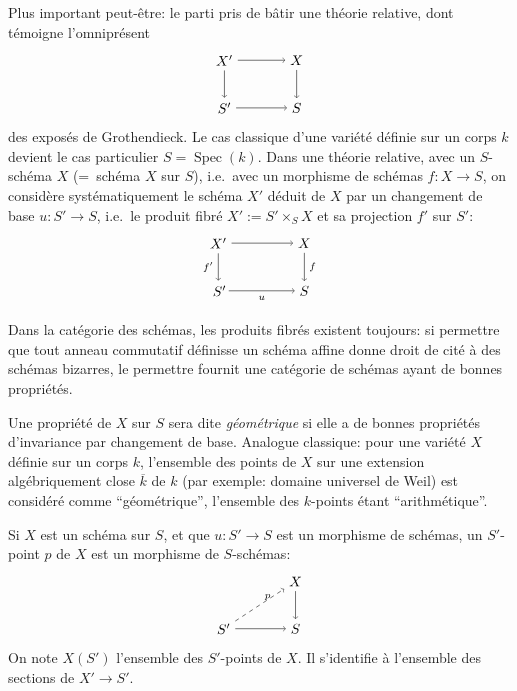 \documentclass[11pt,a4paper]{article}
\theoremstyle{plain}
\theoremstyle{definition}
\DeclareMathOperator{\Spec}{Spec}
\begin{document}
Plus important peut-\^etre: le parti pris de b\^atir une th\'eorie relative, dont t\'emoigne l'omnipr\'esent
\[
\begin{tikzpicture}[baseline=-0.5ex,scale=1.2]
\node (X') at (0,1) {$X'$};
\node (X) at (1.5,1) {$X$};
\node (S') at (0,0) {$S'$};
\node (S) at (1.5,0) {$S$};
\draw[->] (X') -- (X);
\draw[->] (X') -- (S');
\draw[->] (X) -- (S);
\draw[->] (S') -- (S);
\end{tikzpicture}
\]
des expos\'es de Grothendieck. Le cas classique d'une vari\'et\'e d\'efinie sur un corps $k$ devient le cas particulier $S = \Spec(k)$. Dans une th\'eorie relative, avec un $S$-sch\'ema $X$ (=~sch\'ema $X$ sur $S$), i.e.\ avec un morphisme de sch\'emas $f \colon X \to S$, on consid\`ere syst\'ematiquement le sch\'ema $X'$ d\'eduit de $X$ par un changement de base $u \colon S' \to S$, i.e.\ le produit fibr\'e $X' := S' \times_S X$ et sa projection $f'$ sur $S'$:
\[
\begin{tikzpicture}[baseline=-0.5ex,scale=1.2]
\node (X') at (0,1) {$X'$};
\node (X) at (1.8,1) {$X$};
\node (S') at (0,0) {$S'\!$};
\node (S) at (1.8,0) {$S$};
\draw[->] (X') -- (X);
\draw[->] (X') -- (S') node[midway,left] {$\scriptstyle f'$};
\draw[->] (X) -- (S) node[midway,right] {$\scriptstyle f$};
\draw[->] (S') -- (S) node[midway,below] {$\scriptstyle u$};
\end{tikzpicture}
\]

Dans la cat\'egorie des sch\'emas, les produits fibr\'es existent toujours: si permettre que tout anneau commutatif d\'efinisse un sch\'ema affine donne droit de cit\'e \`a des sch\'emas bizarres, le permettre fournit une cat\'egorie de sch\'emas ayant de bonnes propri\'et\'es.

Une propri\'et\'e de $X$ sur $S$ sera dite \emph{g\'eom\'etrique} si elle a de bonnes propri\'et\'es d'invariance par changement de base. Analogue classique: pour une vari\'et\'e $X$ d\'efinie sur un corps $k$, l'ensemble des points de $X$ sur une extension alg\'ebriquement close $\overline{k}$ de $k$ (par exemple: domaine universel de Weil) est consid\'er\'e comme ``g\'eom\'etrique'', l'ensemble des $k$-points \'etant ``arithm\'etique''.

Si $X$ est un sch\'ema sur $S$, et que $u \colon S' \to S$ est un morphisme de sch\'emas, un $S'$-point $p$ de $X$ est un morphisme de $S$-sch\'emas:
\[
\begin{tikzpicture}[baseline=-0.5ex,scale=1.2]
\node (X) at (1.5,1) {$X$};
\node (S') at (0,0) {$S'$};
\node (S) at (1.5,0) {$S$};
\draw[->] (X) -- (S);
\draw[->] (S') -- (S);
\draw[->,dashed] (S') -- (X) node[midway,above right] {$\scriptstyle p$};
\end{tikzpicture}
\]
On note $X(S')$ l'ensemble des $S'$-points de $X$. Il s'identifie \`a l'ensemble des sections de $X' \to S'$.
\end{document}
